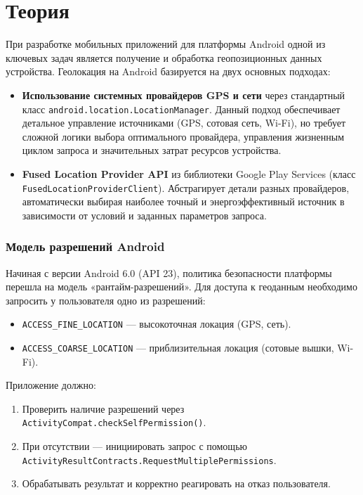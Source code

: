 \chapter*{Теория}

При разработке мобильных приложений для платформы Android одной из ключевых задач является получение и обработка геопозиционных данных устройства. Геолокация на Android базируется на двух основных подходах:
\begin{itemize}
    \item \textbf{Использование системных провайдеров GPS и сети} через стандартный класс \texttt{android.location.LocationManager}. Данный подход обеспечивает детальное управление источниками (GPS, сотовая сеть, Wi-Fi), но требует сложной логики выбора оптимального провайдера, управления жизненным циклом запроса и значительных затрат ресурсов устройства.
    \item \textbf{Fused Location Provider API} из библиотеки Google Play Services (класс \texttt{FusedLocationProviderClient}). Абстрагирует детали разных провайдеров, автоматически выбирая наиболее точный и энергоэффективный источник в зависимости от условий и заданных параметров запроса.
\end{itemize}

\subsection*{Модель разрешений Android}
Начиная с версии Android 6.0 (API 23), политика безопасности платформы перешла на модель «рантайм-разрешений». Для доступа к геоданным необходимо запросить у пользователя одно из разрешений:
\begin{itemize}
    \item \texttt{ACCESS\_FINE\_LOCATION} — высокоточная локация (GPS, сеть).
    \item \texttt{ACCESS\_COARSE\_LOCATION} — приблизительная локация (сотовые вышки, Wi-Fi).
\end{itemize}
Приложение должно:
\begin{enumerate}
    \item Проверить наличие разрешений через \texttt{ActivityCompat.checkSelfPermission()}.
    \item При отсутствии — инициировать запрос с помощью \texttt{ActivityResultContracts.RequestMultiplePermissions}.
    \item Обрабатывать результат и корректно реагировать на отказ пользователя.
\end{enumerate}

